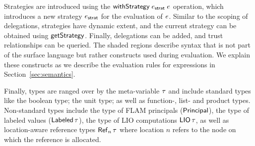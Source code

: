 Strategies are introduced using the $\mathsf{withStrategy}\;e_{\mathsf{strat}}\;e$ operation, which introduces a new strategy $e_{\mathsf{strat}}$ for the evaluation of $e$. Similar to the scoping of delegations, strategies have dynamic extent, and the current strategy can be obtained using $\mathsf{getStrategy}$. Finally, delegations can be added, and trust relationships can be queried. The shaded regions describe syntax that is not part of the surface language but rather constructs used during evaluation. We explain these constructs as we describe the evaluation rules for expressions in Section~\ref{sec:semantics}.


Finally, types are ranged over by the meta-variable $\tau$ and include standard types like the boolean type; the unit type; as well as function-, list- and product types. Non-standard types include the type of FLAM principals ($\mathsf{Principal}$), the type of labeled values ($\mathsf{Labeled}\,\tau$), the type of LIO computations $\mathsf{LIO}\,\tau$, as well as location-aware reference types $\reftype[n]{\type}$ where location $n$ refers to the node on which the reference is allocated.

